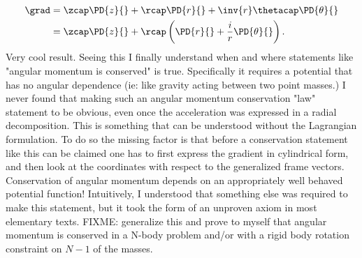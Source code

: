 {\begin{equation}
\begin{aligned}
\grad
&= \zcap \PD{z}{} + \rcap \PD{r}{} + \inv{r} \thetacap \PD{\theta}{} \\
&= \zcap \PD{z}{} + \rcap \left(\PD{r}{} + \frac{i}{r} \PD{\theta}{} \right).
\end{aligned}
\end{equation}
%
Very cool result.  Seeing this I finally understand when and where statements like "angular momentum is conserved" is true.  Specifically it requires a potential that has no angular dependence (ie: like gravity acting between two point masses.)
%
I never found that making such an angular momentum conservation "law" statement to be obvious, even once the acceleration was expressed in a radial decomposition.  This is something that can be understood without the Lagrangian formulation.  To do so the missing factor is that before a conservation statement like this can be claimed one has to first express the gradient in cylindrical form, and then look at the coordinates with respect to the generalized frame vectors.  Conservation of angular momentum depends on an appropriately well behaved potential function!  Intuitively, I understood that something else was required to make this statement, but it took the form of an unproven axiom in most elementary texts.
%
FIXME: generalize this and prove to myself that angular momentum is conserved in a N-body problem and/or with a rigid body rotation constraint on \(N-1\) of the masses.
%
}
